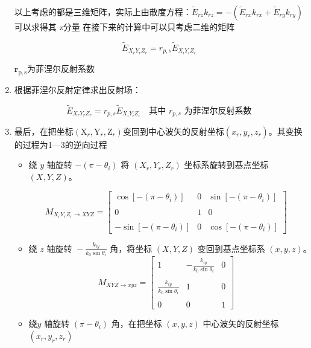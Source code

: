 \documentclass[12pt]{ctexart}
\numberwithin{equation}{section} %
\begin{document}
\begin{enumerate}
以上考虑的都是三维矩阵，实际上由散度方程：$\tilde{E}_{rz}k_{rz}=-(\tilde{E}_{rx}k_{rx}+\tilde{E}_{ry}k_{ry})$可以求得其 z分量
在接下来的计算中可以只考虑二维的矩阵

$$\tilde{E}_{X_rY_rZ_r}=r_{p,s}\tilde{E}_{X_iY_iZ_i}$$

 $\mathbf{r}_{\mathrm{p,s}}$为菲涅尔反射系数

 \item 根据菲涅尔反射定律求出反射场：

 \[
 \tilde{E}_{X_r Y_r Z_r} = r_{p,s} \tilde{E}_{X_i Y_i Z_i} \quad \text{其中 } r_{p,s} \text{ 为菲涅尔反射系数}
 \]
\item 最后，在把坐标$(\mathrm X_r,\mathrm Y_r,\mathrm Z_r)$变回到中心波矢的反射坐标$(x_r,y_r,z_r)$。其变换的过程为1—3的逆向过程
\begin{itemize}
    \item 绕 $y$ 轴旋转 $-(\pi - \theta_i)$ 将 $(X_r, Y_r, Z_r)$ 坐标系旋转到基点坐标 $(X, Y, Z)$。

    \[
    M_{X_r Y_r Z_r \to XYZ} = \begin{bmatrix}
        \cos\left[-\left(\pi - \theta_i\right)\right] & 0 & \sin\left[-\left(\pi - \theta_i\right)\right] \\\\
        0 & 1 & 0 \\\\
        -\sin\left[-\left(\pi - \theta_i\right)\right] & 0 & \cos\left[-\left(\pi - \theta_i\right)\right]
    \end{bmatrix}
    \]
    \item$ \text{绕 } z \text{ 轴旋转 } -\frac{k_{iy}}{k_0 \sin{\theta_i}} \text{ 角，将坐标 } (X,Y,Z) \text{ 变回到基点坐标系 } (x,y,z)。$
    \[
        M_{XYZ \to xyz} = \begin{bmatrix}
            1 & -\frac{k_{iy}}{k_0 \sin{\theta_i}} & 0 \\\\
            \frac{k_{iy}}{k_0 \sin{\theta_i}} & 1 & 0 \\\\
            0 & 0 & 1
        \end{bmatrix}
        \]
    \item 绕$ y $ 轴旋转
    $( \pi  -  \theta _{i} )$ 角，在把坐标 $(x,y,z)$
    中心波矢的反射坐标$(x_r,y_r,z_r)$
    

\end{itemize}
\end{enumerate}
\end{document}
